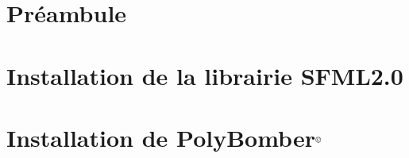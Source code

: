 \section{Préambule}


\section{Installation de la librairie SFML2.0}


\section{Installation de PolyBomber$^{\mbox{\scriptsize{\copyright}}}$}
